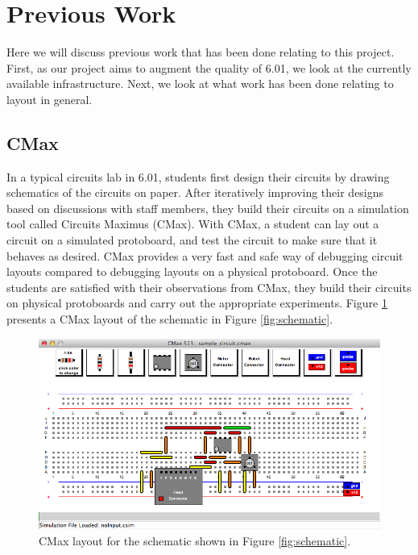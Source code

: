 \section{Previous Work}

Here we will discuss previous work that has been done relating to this project.
First, as our project aims to augment the quality of 6.01, we look at the
currently available infrastructure. Next, we look at what work has
been done relating to layout in general.

\subsection{CMax}

In a typical circuits lab in 6.01, students first design their circuits by
drawing schematics of the circuits on paper.
After iteratively improving their designs based on discussions with staff
members, they build their circuits on a simulation tool called Circuits Maximus
(CMax)\cite{cmax}.
With CMax, a student can lay out a circuit on a simulated protoboard, and test
the circuit to make sure that it behaves as desired. CMax provides a very fast
and safe way of debugging circuit layouts compared to debugging layouts on a
physical protoboard. Once the students are satisfied with their
observations from CMax, they build their circuits on physical protoboards and
carry out the appropriate experiments. Figure \ref{fig:cmax_sample} presents a
CMax layout of the schematic in Figure \ref{fig:schematic}.

\begin{figure}
\begin{center}
\includegraphics[width=\textwidth]{Images/sample_circuit.png}
\caption[CMax]{CMax layout for the schematic shown in Figure
\ref{fig:schematic}.}
\label{fig:cmax_sample}
\end{center}
\end{figure}

